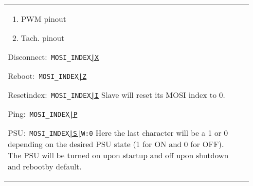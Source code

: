 \documentclass{article}
\begin{document}
\begin{center}
\begin{longtable}{| p{} | p{} |}
\begin{itemize}
{\begin{enumerate}
			\item PWM pinout
			\item Tach. pinout
			\end{enumerate}
		\item {Disconnect:}\
		\linebreak\texttt{MOSI\_INDEX\underline{|X}}
		\item {Reboot:}\
		\linebreak\texttt{MOSI\_INDEX\underline{|Z}}
		\item {Reset\hspace{.5em}index:}\
		\linebreak\texttt{MOSI\_INDEX\underline{|I}}
		\linebreak Slave will reset its MOSI index to 0.
		\item {Ping:}\
		\linebreak\texttt{MOSI\_INDEX\underline{|P}}
		\item {PSU:}\
		\linebreak\texttt{MOSI\_INDEX\underline{|S|}W:0}
		\linebreak Here the last character will be a 1 or 0 depending on the desired PSU			state (1 for ON and 0 for OFF). The PSU will be turned on upon startup and off
			upon shutdown and rebootby default.
		
}
\end{itemize}
\end{longtable}
\end{center}
\end{document}

